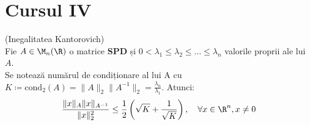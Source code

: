 
\section*{Cursul IV}

\begin{teorema}[I. Lemă]{(Inegalitatea Kantorovich)}
    \text{ }\\[0.5em]
    Fie $A \in \M_n(\R)$ o matrice \textbf{SPD} și $0 < \lambda_1 \le \lambda_2 \le \dots \le \lambda_n$ valorile proprii ale lui $A$. \\
    Se notează numărul de condiționare al lui A cu $K \coloneqq \text{cond}_2(A) = \|A\|_2 \|A^{-1}\|_2 = \frac{\lambda_n}{\lambda_1}$. Atunci:
    $$
    \frac{\|x\|_A \|x\|_{A^{-1}}}{\|x\|_2^2} \le \frac{1}{2} \left( \sqrt{K} + \frac{1}{\sqrt{K}} \right), \quad \forall x \in \R^n, x \neq 0 
    $$

\end{teorema}

